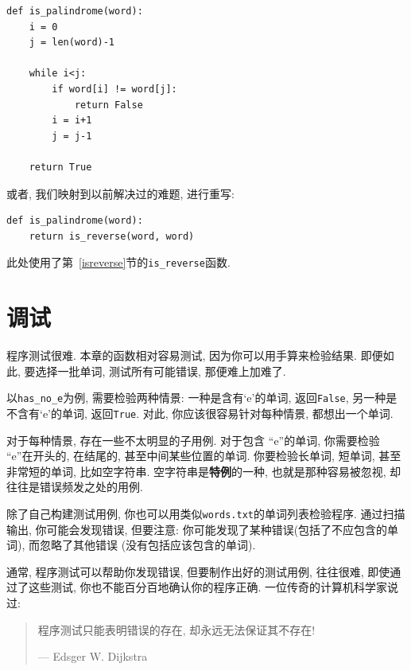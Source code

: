 \documentclass[10pt]{book}
\begin{document}
\begin{verbatim}
def is_palindrome(word):
    i = 0
    j = len(word)-1

    while i<j:
        if word[i] != word[j]:
            return False
        i = i+1
        j = j-1

    return True
\end{verbatim}

或者, 我们映射到以前解决过的难题, 进行重写:

\begin{verbatim}
def is_palindrome(word):
    return is_reverse(word, word)
\end{verbatim}
%
此处使用了第~\ref{isreverse}节的\verb"is_reverse"函数.


\section{调试}

程序测试很难. 本章的函数相对容易测试, 因为你可以用手算来检验结果. 
即便如此, 要选择一批单词, 测试所有可能错误, 那便难上加难了. 

以\verb"has_no_e"为例, 需要检验两种情景: 一种是含有`e'的单词, 返回{\tt False}, 
另一种是不含有`e'的单词, 返回{\tt True}. 
对此, 你应该很容易针对每种情景, 都想出一个单词. 

对于每种情景, 存在一些不太明显的子用例. 
对于包含 ``e''的单词, 你需要检验 ``e''在开头的, 在结尾的, 甚至中间某些位置的单词. 
你要检验长单词, 短单词, 甚至非常短的单词, 比如空字符串. 
空字符串是{\bf 特例}的一种, 也就是那种容易被忽视, 却往往是错误频发之处的用例. 

除了自己构建测试用例, 你也可以用类似{\tt words.txt}的单词列表检验程序. 
通过扫描输出, 你可能会发现错误, 但要注意: 
你可能发现了某种错误(包括了不应包含的单词), 而忽略了其他错误
(没有包括应该包含的单词). 

通常, 程序测试可以帮助你发现错误, 但要制作出好的测试用例, 
往往很难, 即使通过了这些测试, 你也不能百分百地确认你的程序正确. 
一位传奇的计算机科学家说过:

\begin{quote}

程序测试只能表明错误的存在, 却永远无法保证其不存在!

--- Edsger W. Dijkstra
\end{quote}
\end{document}
